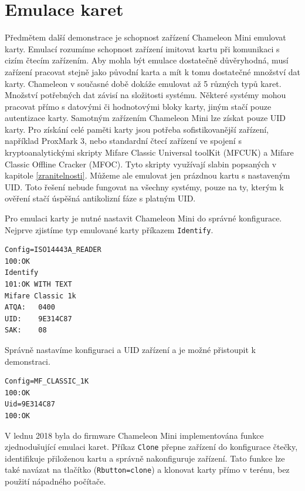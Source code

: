 \section{Emulace karet}
Předmětem další demonstrace je schopnost zařízení Chameleon Mini emulovat karty. Emulací rozumíme schopnost zařízení imitovat kartu při komunikaci s cizím čtecím zařízením. Aby mohla být emulace dostatečně důvěryhodná, musí zařízení pracovat stejně jako původní karta a mít k tomu dostatečné množství dat karty. Chameleon v současné době dokáže emulovat až 5 různých typů karet. Množství potřebných dat závisí na složitosti systému. Některé systémy mohou pracovat přímo s datovými či hodnotovými bloky karty, jiným stačí pouze autentizace karty. Samotným zařízením Chameleon Mini lze získat pouze UID karty. Pro získání celé paměti karty jsou potřeba sofistikovanější zařízení, například ProxMark 3, nebo standardní čtecí zařízení ve spojení s kryptoanalytickými skripty Mifare Classic Universal toolKit (MFCUK) a Mifare Classic Offline Cracker (MFOC)\cite{RelayUtokBP}. Tyto skripty využívají slabin popsaných v kapitole \ref{zranitelnosti}.
Můžeme ale emulovat jen prázdnou kartu s nastaveným UID. Toto řešení nebude fungovat na všechny systémy, pouze na ty, kterým k ověření stačí úspěšná antikolizní fáze s platným UID.\par
Pro emulaci karty je nutné nastavit Chameleon Mini do správné konfigurace. Nejprve zjistíme typ emulované karty příkazem \verb|Identify|.

\begin{lstlisting}[caption=Záznam postupu identifikace karty, label={ChameleonIdentify}]
Config=ISO14443A_READER
100:OK
Identify
101:OK WITH TEXT
Mifare Classic 1k
ATQA:   0400
UID:    9E314C87
SAK:    08
\end{lstlisting}

Správně nastavíme konfiguraci a UID zařízení a je možné přistoupit k demonstraci.

\begin{lstlisting}[caption=Záznam nastavení emulace karty, label={ChameleonSetting}]
Config=MF_CLASSIC_1K
100:OK
Uid=9E314C87
100:OK
\end{lstlisting}

V lednu 2018 byla do firmware Chameleon Mini implementována funkce zjednodušující emulaci karet. Příkaz \verb|Clone| přepne zařízení do konfigurace čtečky, identifikuje přiloženou kartu a správně nakonfiguruje zařízení. Tato funkce lze také navázat na tlačítko (\verb|Rbutton=clone|) a klonovat karty přímo v terénu, bez použití nápadného počítače.

